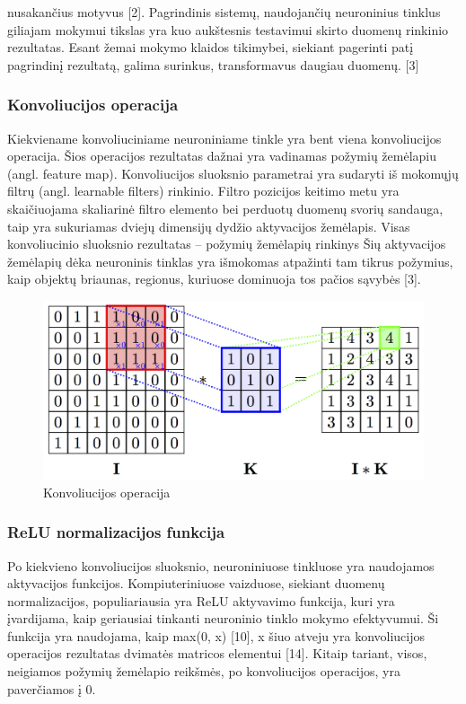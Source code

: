 \documentclass{VUMIFInfBakalaurinis}
\begin{document}
nusakančius motyvus [2]. Pagrindinis sistemų, naudojančių neuroninius tinklus giliajam mokymui tikslas yra kuo aukštesnis testavimui skirto duomenų rinkinio rezultatas. Esant žemai mokymo klaidos tikimybei, siekiant pagerinti patį pagrindinį rezultatą, galima surinkus, transformavus daugiau duomenų. [3]

\subsubsection{Konvoliucijos operacija}
Kiekviename konvoliuciniame neuroniniame tinkle yra bent viena konvoliucijos operacija.  Šios operacijos rezultatas dažnai yra vadinamas požymių žemėlapiu (angl. feature map). Konvoliucijos sluoksnio parametrai yra sudaryti iš mokomųjų filtrų (angl. learnable filters) rinkinio. Filtro pozicijos keitimo metu yra skaičiuojama skaliarinė filtro elemento bei perduotų duomenų svorių sandauga, taip yra sukuriamas dviejų dimensijų dydžio aktyvacijos žemėlapis. Visas konvoliucinio sluoksnio rezultatas – požymių žemėlapių rinkinys Šių aktyvacijos žemėlapių dėka neuroninis tinklas yra išmokomas atpažinti tam tikrus požymius, kaip objektų briaunas,  regionus, kuriuose dominuoja tos pačios sąvybės [3]. 

\begin{figure}[H]
    \centering
    \includegraphics[scale=1.5]{img/konvoliucija.png}
    \caption{Konvoliucijos operacija}
    \label{img:emnist_sudarymas}
\end{figure}

\subsubsection{ReLU normalizacijos funkcija}
Po kiekvieno konvoliucijos sluoksnio, neuroniniuose tinkluose yra naudojamos aktyvacijos funkcijos. Kompiuteriniuose vaizduose, siekiant duomenų normalizacijos, populiariausia yra ReLU aktyvavimo funkcija, kuri yra įvardijama, kaip geriausiai tinkanti neuroninio tinklo mokymo efektyvumui. Ši funkcija yra naudojama, kaip max(0, x) [10], x šiuo atveju yra konvoliucijos operacijos rezultatas dvimatės matricos elementui [14]. Kitaip tariant, visos, neigiamos požymių žemėlapio reikšmės, po konvoliucijos operacijos, yra paverčiamos į 0. 
\end{document}
